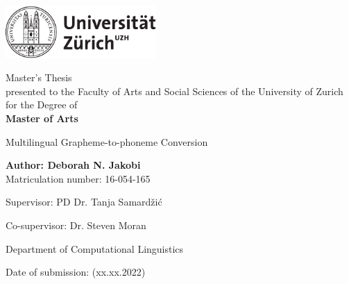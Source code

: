 \begin{titlepage}
\includegraphics[height=20mm]{images/uzh_logo_d_pos}\\

\begin{center}

{\sffamily
Master's Thesis \\
presented to the Faculty of Arts and Social Sciences of the University of Zurich for the Degree of \\
\textbf{Master of Arts} \\

\vspace{2cm}

{\Huge Multilingual Grapheme-to-phoneme Conversion}\\

\vspace{4cm}

\textbf{Author: Deborah N. Jakobi} \\
	Matriculation number: 16-054-165 \\

\vspace{2cm}

Supervisor: PD Dr. Tanja Samardžić 

Co-supervisor: Dr. Steven Moran 

Department of Computational Linguistics

\vfill Date of submission: (xx.xx.2022)

\vspace{3cm}
}
\end{center}

\end{titlepage}

\newpage
